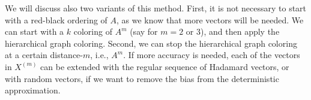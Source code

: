 \documentclass{report}
\begin{document}
We will discuss also two variants of this method. First, it is not
necessary to start with a red-black ordering of $A$, as we know that
more vectors will be needed. We can start with a $k$ coloring of $A^m$
(say for $m=2$ or $3$), and then apply the hierarchical graph coloring.
Second, we can stop the hierarchical graph coloring at a certain
distance-$m$, i.e., $A^m$. If more accuracy is needed, each of the
vectors in $X^{(m)}$ can be extended with the regular sequence of
Hadamard vectors, or with random vectors, if we want to remove the bias from
the deterministic approximation.
\end{document}
